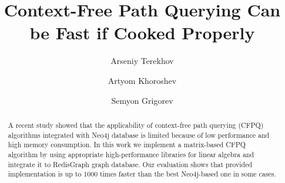 \documentclass[sigconf,edbt,table]{acmart-edbt2020}
\begin{document}
%
\title[Context-Free Path Querying Can be Fast if Cooked Properly]{Context-Free Path Querying Can be Fast if Cooked Properly}



%
\author{Arseniy Terekhov}


\author{Artyom Khoroshev}


\author{Semyon Grigorev}





%
\renewcommand{\shortauthors}{Terekhov, Khoroshev, Grigorev}

%
\begin{abstract}
  A recent study showed that the applicability of context-free path querying (CFPQ) algorithms integrated with Neo4j database is limited because of low performance and high memory consumption. In this work we implement a matrix-based CFPQ algorithm by using appropriate high-performance libraries for linear algebra and integrate it to RedisGraph graph database. Our evaluation shows that provided implementation is up to 1000 times faster than the best Neo4j-based one in some cases.
\end{abstract}
\end{document}
